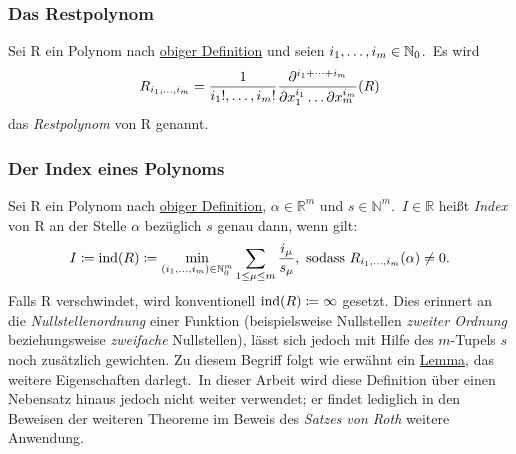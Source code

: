     \subsubsection{Das Restpolynom}
        \label{subsubsec:def-remainder-poly}
        Sei R ein Polynom nach \hyperref[subsubsec:def-poly]{obiger Definition} und seien $i_1, \dots, i_m \in \mathbb
        {N}_0$.\ Es wird
        \begin{equation}
            R_{i_1, \dots, i_m} = \frac{1}{i_1!, \dots, i_m!} \frac{\partial^{i_1 + \dots + i_m}}{
                \partial x_1^{i_1} \dots \partial x_m^{i_m}} (R) \label{eq:def-rempoly}
        \end{equation}
        das \emph{Restpolynom} von R genannt.
    
    \subsubsection{Der Index eines Polynoms}
        \label{subsubsec:def-index}
        \textrm{Sei R ein Polynom nach \hyperref[subsubsec:def-poly]{obiger Definition}, $\alpha \in \mathbb{R}^m$ und
            $s \in \mathbb{N}^m$.\ $I \in \mathbb{R}$ heißt \emph{Index} von R an der Stelle $\alpha$ bezüglich $s$
            genau dann, wenn gilt:}
        \begin{equation}
            I \coloneq \operatorname{ind}(R) \coloneq \min_{(i_1, \dots, i_m) \in \mathbb{N}_0^m} \sum_{1 \leq \mu \leq m} \frac{i_\mu}
            {s_\mu}, \ \textrm{sodass}\  R_{i_1, \dots, i_m}(\alpha) \neq 0. \label{eq:def-index}
        \end{equation}
        Falls R verschwindet, wird konventionell $\operatorname{ind}(R) \coloneq \infty$ gesetzt.
        \newline \newline
        \textrm{Dies erinnert an die \emph{Nullstellenordnung} einer Funktion (beispielsweise Nullstellen \emph
        {zweiter Ordnung} beziehungsweise \emph{zweifache} Nullstellen), lässt sich jedoch mit Hilfe des $m$-Tupels $s$
        noch zusätzlich gewichten.
        \newline \newline
        Zu diesem Begriff folgt wie erwähnt ein \hyperref[subsec:lemma2]{Lemma}, das weitere Eigenschaften darlegt.\ In
        dieser Arbeit wird diese Definition über einen Nebensatz hinaus jedoch nicht weiter verwendet; er findet lediglich
        in den Beweisen der weiteren Theoreme im Beweis des \emph{Satzes von Roth} weitere Anwendung.}
    
